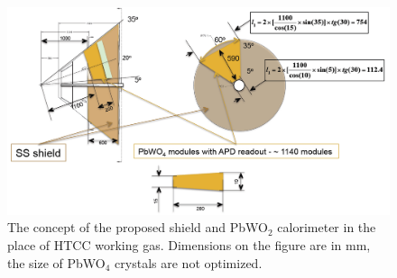 \begin{figure}[h]
\begin{center}
\includegraphics[width=1.\textwidth]{detector_concept.pdf}
\caption{The concept of the proposed shield and PbWO$_2$ calorimeter in the place of HTCC working gas. Dimensions on the figure are in mm, the size of PbWO$_4$ crystals are not optimized.}
\label{fig:shield}
\end{center}
\end{figure}


\clearpage
